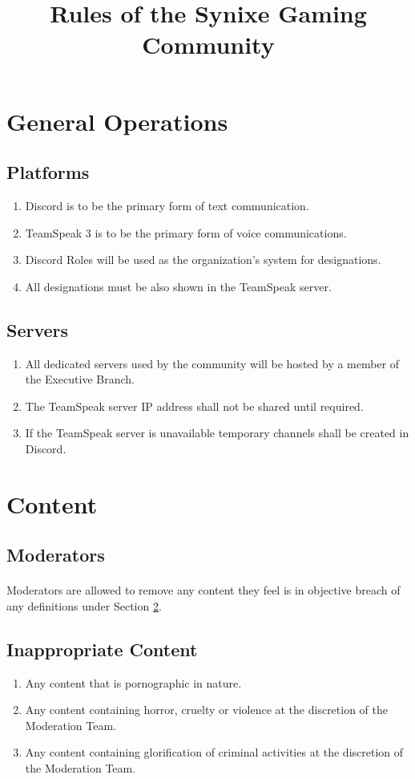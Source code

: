 \documentclass[10pt,a4paper]{article}
\title{Rules of the Synixe Gaming Community}
\begin{document}
\maketitle
\newpage

\section{General Operations}
\subsection{Platforms}
\begin{enumerate}
	\item Discord is to be the primary form of text communication.
	\item TeamSpeak 3 is to be the primary form of voice communications.
	\item Discord Roles will be used as the organization's system for designations.
	\item All designations must be also shown in the TeamSpeak server.
\end{enumerate}
\subsection{Servers}
\begin{enumerate}
	\item All dedicated servers used by the community will be hosted by a member of the Executive Branch.
	\item The TeamSpeak server IP address shall not be shared until required.
	\item If the TeamSpeak server is unavailable temporary channels shall be created in Discord.
\end{enumerate}
\section{Content} \label{content}
\subsection{Moderators}
\paragraph{}
Moderators are allowed to remove any content they feel is in objective breach of any definitions under Section \ref{content}.
\subsection{Inappropriate Content}
\begin{enumerate}
	\item Any content that is pornographic in nature.
	\item Any content containing horror, cruelty or violence at the discretion of the Moderation Team.
	\item Any content containing glorification of criminal activities at the discretion of the Moderation Team.
\end{enumerate}
\end{document}
